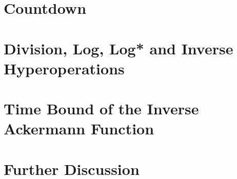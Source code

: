 \documentclass[a4paper,USenglish,cleveref, autoref]{lipics-v2019}
\theoremstyle{plain}
\theoremstyle{definition}
\begin{document}
\section{Countdown}
\label{sec:countdown}


\section{Division, Log, Log* and Inverse Hyperoperations}
\label{sec: inv-hyperop}


\section{Time Bound of the Inverse Ackermann Function}
\label{sec: inv-ack}


\section{Further Discussion}
\label{sec: discussion}
%




%




\end{document}
